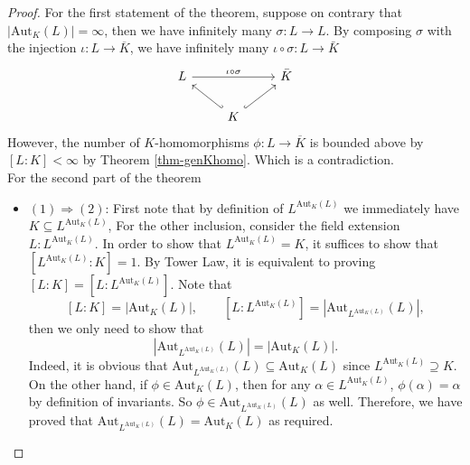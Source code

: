 \begin{proof}
    For the first statement of the theorem, suppose on contrary that $|\mathrm{Aut}_{K}(L)|=\infty$, then we have infinitely many $\sigma:L\rightarrow L$. By composing $\sigma$ with the injection $\iota: L \to \overline{K}$, we have infinitely many $\iota \circ \sigma:L\rightarrow \bar{K}$ \[\begin{tikzcd}
	L && {\bar{K}} \\
	& K
	\arrow["\iota \circ \sigma", from=1-1, to=1-3]
	\arrow[hook', from=2-2, to=1-1]
	\arrow[hook, from=2-2, to=1-3]
\end{tikzcd}\]
    However, the number of $K$-homomorphisms $\phi: L \to \overline{K}$ is bounded above by $[L:K] < \infty$ by Theorem \ref{thm-genKhomo}. Which is a contradiction.\\
    
    For the second part of the theorem
    \begin{itemize}
        \item $(1)\Rightarrow(2)$: First note that by definition of $L^{\mathrm{Aut}_{K}(L)}$ we immediately have $K\subseteq L^{\mathrm{Aut}_{K}(L)}$, For the other inclusion, consider the field extension $L:L^{\mathrm{Aut}_{K}(L)}$. In order to show that $L^{\mathrm{Aut}_{K}(L)}=K$, it suffices to show that $[L^{\mathrm{Aut}_{K}(L)}:K] = 1$. By Tower Law, it is equivalent to proving $[L:K]=[L:L^{\mathrm{Aut}_{K}(L)}]$. Note that 
        $$[L:K]=|\mathrm{Aut}_{K}(L)|,\quad \quad [L:L^{\mathrm{Aut}_{K}(L)}]=|\mathrm{Aut}_{ L^{\mathrm{Aut}_{K}(L)}}(L)|,$$ then we only need to show that
$$|\mathrm{Aut}_{L^{\mathrm{Aut}_{K}(L)}}(L)|= |\mathrm{Aut}_{K}(L)|.$$ 
        Indeed, it is obvious that
    $\mathrm{Aut}_{L^{\mathrm{Aut}_{K}(L)}}(L)\subseteq \mathrm{Aut}_{K}(L)$ since $L^{\mathrm{Aut}_{K}(L)} \supseteq K$. On the other hand, if $\phi \in \mathrm{Aut}_{K}(L)$, then for any $\alpha \in L^{\mathrm{Aut}_{K}(L)}$, $\phi(\alpha) = \alpha$ by definition of invariants. So $\phi \in \mathrm{Aut}_{L^{\mathrm{Aut}_{K}(L)}}(L)$ as well. Therefore, we have proved that  $\mathrm{Aut}_{L^{\mathrm{Aut}_{K}(L)}}(L) = \mathrm{Aut}_{K}(L)$
    as required.    
        

\end{itemize}
\end{proof}

